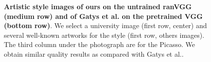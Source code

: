 \documentclass{article}
\begin{document}
\begin{figure}[htbp!]
        \caption{
					\textbf{%
                             Artistic style images of ours on the untrained ranVGG (medium row) and
						    of Gatys et al.\cite{Gatys2015texture} on the pretrained VGG (bottom row)}.
We select a university image (first row, center) and several well-known artworks for the style (first row, others images).
The third column under the photograph are for the Picasso.
We obtain similar quality results as compared with Gatys et al.\cite{Gatys2015Style}.
				}
\vspace{-2em}
\label{Fig:Cornell}
\end{figure}
\end{document}
